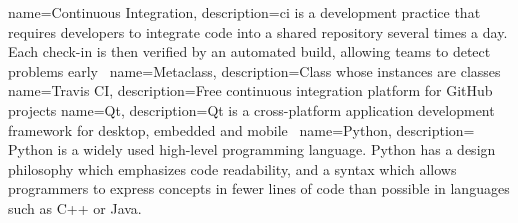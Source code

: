 {
    name={Continuous Integration},
    description={\acrlong{ci} is a development practice that requires developers
    to integrate code into a shared repository several times a day.  Each
check-in is then verified by an automated build, allowing teams to detect
problems early~\cite{thoughtworks2017}}
}
{
    name=Metaclass,
    description={Class whose instances are classes}
}
{
    name={Travis CI},
    description={Free continuous integration platform for GitHub projects}
}
{
    name=Qt,
    description={Qt is a cross-platform application development framework for
    desktop, embedded and mobile~\cite{aboutQt2017}}
}
{
    name=Python,
    description= {Python is a widely used high-level programming language. Python has a design philosophy which emphasizes code readability, and a syntax which allows programmers to express concepts in fewer lines of code than possible in languages such as C++ or Java.}
}

